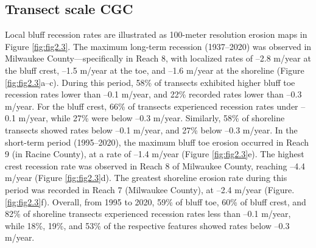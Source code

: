\subsection{Transect scale CGC} 
\label{Transect scale CGC} 

Local bluff recession rates are illustrated as 100-meter resolution erosion maps
in Figure \ref{fig:fig2.3}. The maximum long-term recession (1937–2020) was
observed in Milwaukee County—specifically in Reach 8, with localized rates of
–2.8 m/year at the bluff crest, –1.5 m/year at the toe, and –1.6 m/year at the
shoreline (Figure \ref{fig:fig2.3}a–c). During this period, 58\% of transects
exhibited higher bluff toe recession rates lower than –0.1 m/year,  and 22\%
recorded rates lower than –0.3 m/year. For the bluff crest, 66\% of transects
experienced recession rates under –0.1 m/year, while 27\% were below –0.3
m/year. Similarly, 58\% of shoreline transects showed rates below –0.1 m/year,
and 27\% below –0.3 m/year.  In the short-term period (1995–2020), the maximum
bluff toe erosion occurred in Reach 9 (in Racine County), at a rate of –1.4
m/year (Figure \ref{fig:fig2.3}e). The highest crest recession rate was observed
in Reach 8 of Milwaukee County, reaching –4.4 m/year (Figure \ref{fig:fig2.3}d).
The greatest shoreline erosion rate during this period was recorded in Reach 7
(Milwaukee County), at –2.4 m/year (Figure. \ref{fig:fig2.3}f). Overall, from
1995 to 2020, 59\% of bluff toe, 60\% of bluff crest, and 82\% of shoreline
transects experienced recession rates less than –0.1 m/year, while 18\%, 19\%,
and 53\% of the respective features showed rates below –0.3 m/year. 

